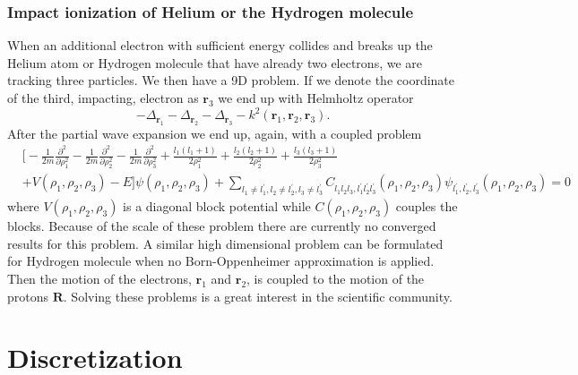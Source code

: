 \documentclass[mathpazo]{cicp}
\theoremstyle{definition}
\numberwithin{equation}{section}
\providecommand{\wv}{}
\begin{document}
\subsubsection{Impact ionization of Helium or the Hydrogen molecule}\label{sec:impactionisation}
  When an \wv{additional} electron with sufficient energy collides and breaks up the
  Helium atom or Hydrogen molecule \wv{that have already two electrons, we are tracking three particles}. We then have a 9D problem.
  If we denote the coordinate of the third, impacting, electron as
  $\mathbold{r}_3$ we end up with Helmholtz operator
\begin{equation}
  -\Delta_{\mathbold{r}_1} - \Delta_{\mathbold{r}_2} - \Delta_{\mathbold{r}_3} - k^2(\mathbold{r}_1,\mathbold{r}_2,\mathbold{r}_3).
\end{equation}
After \wv{the partial wave expansion} we end up, again, with a coupled problem 
\begin{equation}
\begin{aligned}
&\Bigg[ -\frac{1}{2m}\frac{\partial^2}{\partial \rho_1^2} -\frac{1}{2m}\frac{\partial^2}{\partial \rho_2^2} 
 -\frac{1}{2m}\frac{\partial^2}{\partial \rho_3^2} + \frac{l_1(l_1+1)}{2 \rho_1^2}  + \frac{l_2(l_2+1)}{2 \rho_2^2}  + \frac{l_3(l_3+1)}{2 \rho_3^2} \\
   &+V(\rho_1,\rho_2,\rho_3)-E \Bigg]  \psi(\rho_1,\rho_2, \rho_3) 
 + \sum_{l_1 \neq l_1^\prime,l_2\neq l_2^\prime,l_3\neq l_3^\prime} \!\!\!\!\!C_{l_1l_2l_3,l^\prime_1l^\prime_2l^\prime_3}
(\rho_1,\rho_2,\rho_3) 
\psi_{l_1^\prime,l_2^\prime,l_3^\prime}(\rho_1,\rho_2,\rho_3)  = 0
\end{aligned}\label{eq:coupled3electron}
\end{equation}
where $V(\rho_1,\rho_2,\rho_3)$ is a diagonal block potential while
$C(\rho_1,\rho_2,\rho_3)$ couples the blocks.  Because of the scale of
these problem there are currently no converged results for this
problem.  A similar high dimensional problem can be formulated for
Hydrogen molecule when no Born-Oppenheimer approximation is applied.
Then the motion of the electrons, $\mathbold{r}_1$ and
$\mathbold{r}_2$, is coupled to the motion of the protons
$\mathbold{R}$.  \wv{Solving these problems is a great interest in the
scientific community.}

\section{Discretization}\label{sec:discretize}
\end{document}
